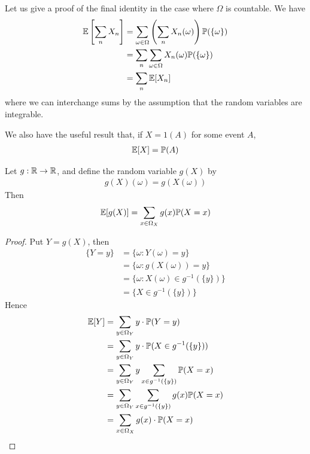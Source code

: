 \documentclass{../template/note}
\begin{document}
    Let us give a proof of the final identity in the case where \(\Omega\) is countable. We have
    \begin{align*}
        \mathbb E\left[\sum_n X_n\right] &= \sum_{\omega \in \Omega} \left(\sum_n X_n(\omega)\right) \mathbb P(\{\omega\}) \\
        &= \sum_n \sum_{\omega \in \Omega} X_n(\omega) \mathbb P(\{\omega\}) \\
        &= \sum_n \mathbb E[X_n]
    \end{align*}
    where we can interchange sums by the assumption that the random variables are integrable.

    We also have the useful result that, if \(X = 1(A)\) for some event \(A\),
    \begin{align*}
        \mathbb E[X] = \mathbb P(A)
    \end{align*}
    
    \begin{proposition}
        Let \(g: \mathbb R \to \mathbb R\), and define the random variable \(g(X)\) by
        \begin{align*}
            g(X)(\omega) = g(X(\omega))
        \end{align*}
        Then
        \begin{align*}
            \mathbb E[g(X)] = \sum_{x \in \Omega_X} g(x) \mathbb P(X = x)
        \end{align*}
    \end{proposition}
    
    \begin{proof}
        Put \(Y = g(X)\), then
        \begin{align*}
            \{Y = y\} &= \{\omega: Y(\omega) = y\} \\
            &= \{\omega: g(X(\omega)) = y\} \\
            &= \{\omega: X(\omega) \in g^{-1}(\{y\})\} \\
            &= \{X \in g^{-1}(\{y\})\}
        \end{align*}
        Hence
        \begin{align*}
            \mathbb E[Y] &= \sum_{y \in \Omega_Y} y \cdot \mathbb P(Y = y) \\
            &= \sum_{y \in \Omega_Y} y \cdot \mathbb P(X \in g^{-1}(\{y\})) \\
            &= \sum_{y \in \Omega_Y} y \sum_{x \in g^{-1}(\{y\})} \mathbb P(X = x) \\
            &= \sum_{y \in \Omega_Y} \sum_{x \in g^{-1}(\{y\})} g(x) \mathbb P(X = x) \\
            &= \sum_{x \in \Omega_X} g(x) \cdot \mathbb P(X = x)
        \end{align*}
    \end{proof}
    
\end{document}

